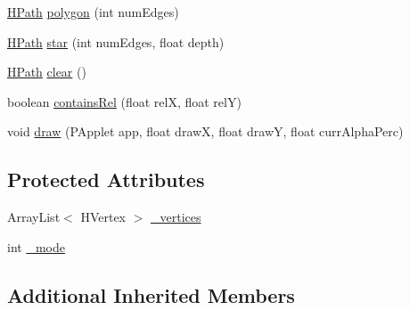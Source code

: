 \begin{DoxyCompactItemize}
\item 
\hyperlink{classhype_1_1drawable_1_1_h_path}{H\-Path} \hyperlink{classhype_1_1drawable_1_1_h_path_afc89409cdefca947d76595601cf50ae6}{polygon} (int num\-Edges)
\item 
\hyperlink{classhype_1_1drawable_1_1_h_path}{H\-Path} \hyperlink{classhype_1_1drawable_1_1_h_path_a80d11cfd16ae84a07aa52b7d59e301ce}{star} (int num\-Edges, float depth)
\item 
\hyperlink{classhype_1_1drawable_1_1_h_path}{H\-Path} \hyperlink{classhype_1_1drawable_1_1_h_path_aae95fc174db2c006e5cb7f2df99b5232}{clear} ()
\item 
boolean \hyperlink{classhype_1_1drawable_1_1_h_path_a2f3932e890ba712db9935def871ffc5d}{contains\-Rel} (float rel\-X, float rel\-Y)
\item 
void \hyperlink{classhype_1_1drawable_1_1_h_path_af3200ef25e78cb2ac3efadce936bc017}{draw} (P\-Applet app, float draw\-X, float draw\-Y, float curr\-Alpha\-Perc)
\end{DoxyCompactItemize}
\subsection*{Protected Attributes}
\begin{DoxyCompactItemize}
\item 
Array\-List$<$ H\-Vertex $>$ \hyperlink{classhype_1_1drawable_1_1_h_path_a61f9c092fff56509a72121fb4e707611}{\-\_\-vertices}
\item 
int \hyperlink{classhype_1_1drawable_1_1_h_path_ac3f65fdd8abc15cf5a2d9f007282b33a}{\-\_\-mode}
\end{DoxyCompactItemize}
\subsection*{Additional Inherited Members}


